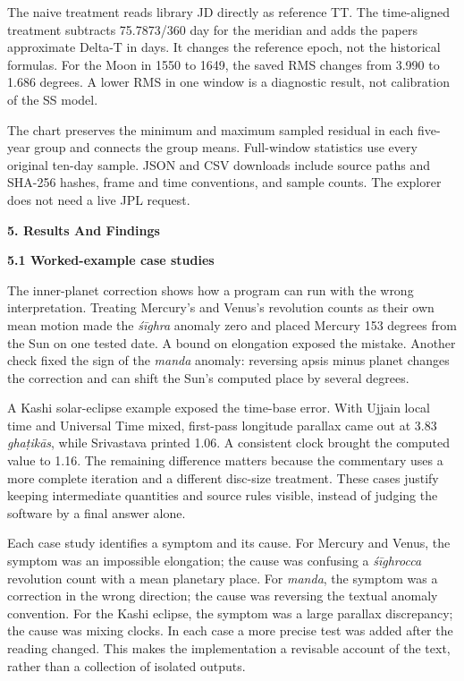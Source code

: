 \documentclass[
]{article}
\begin{document}
The naive treatment reads library JD directly as reference TT. The
time-aligned treatment subtracts 75.7873/360 day for the meridian and
adds the paper\textquotesingle s approximate Delta-T in days. It changes
the reference epoch, not the historical formulas. For the Moon in 1550
to 1649, the saved RMS changes from 3.990 to 1.686 degrees. A lower RMS
in one window is a diagnostic result, not calibration of the SS model.

The chart preserves the minimum and maximum sampled residual in each
five-year group and connects the group means. Full-window statistics use
every original ten-day sample. JSON and CSV downloads include source
paths and SHA-256 hashes, frame and time conventions, and sample counts.
The explorer does not need a live JPL request.

\textbf{5. Results And Findings}

\textbf{5.1 Worked-example case studies}

The inner-planet correction shows how a program can run with the wrong
interpretation. Treating Mercury's and Venus's revolution counts as
their own mean motion made the \emph{śīghra} anomaly zero and placed
Mercury 153 degrees from the Sun on one tested date. A bound on
elongation exposed the mistake. Another check fixed the sign of the
\emph{manda} anomaly: reversing apsis minus planet changes the
correction and can shift the Sun's computed place by several degrees.

A Kashi solar-eclipse example exposed the time-base error. With Ujjain
local time and Universal Time mixed, first-pass longitude parallax came
out at 3.83 \emph{ghaṭikās}, while Srivastava printed 1.06. A consistent
clock brought the computed value to 1.16. The remaining difference
matters because the commentary uses a more complete iteration and a
different disc-size treatment. These cases justify keeping intermediate
quantities and source rules visible, instead of judging the software by
a final answer alone.

Each case study identifies a symptom and its cause. For Mercury and
Venus, the symptom was an impossible elongation; the cause was confusing
a \emph{śīghrocca} revolution count with a mean planetary place. For
\emph{manda}, the symptom was a correction in the wrong direction; the
cause was reversing the textual anomaly convention. For the Kashi
eclipse, the symptom was a large parallax discrepancy; the cause was
mixing clocks. In each case a more precise test was added after the
reading changed. This makes the implementation a revisable account of
the text, rather than a collection of isolated outputs.
\end{document}
